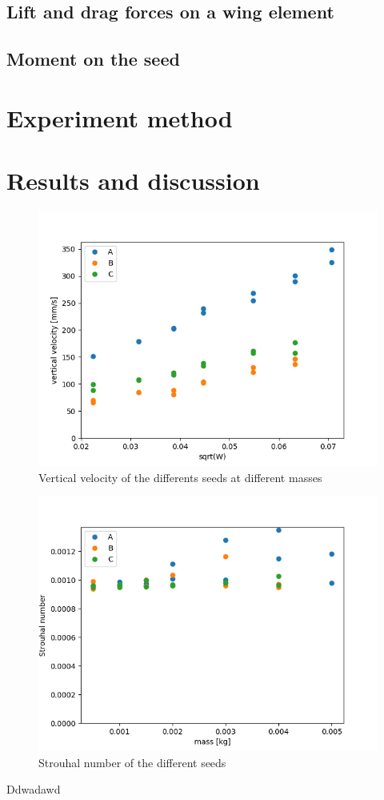 \documentclass[aps,reprint]{revtex4-1}
\newcommand\blankpage{%
  \null
  \thispagestyle{empty}%
  \addtocounter{page}{-1}%
  \newpage}
\begin{document}
\subsection{Lift and drag forces on a wing element}

\subsection{Moment on the seed}

\section{Experiment method}
\label{sec:method}
\section{Results and discussion}
\begin{figure}
  \includegraphics[width=0.8\linewidth]{oppg1.png}
  \caption{
    \label{fig:oppg1}
    Vertical velocity of the differents seeds at different masses
  }
\end{figure}
\begin{figure}
  \includegraphics[width=0.8\linewidth]{oppg2.png}
  \caption{
    \label{fig:oppg2}
    Strouhal number of the different seeds
  }
\end{figure}
\label{sec:results}
Ddwadawd

\blankpage
\end{document}
